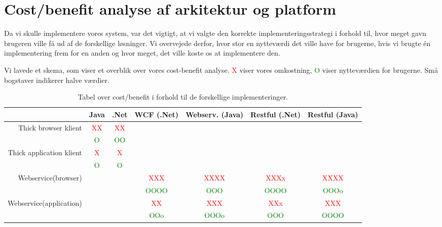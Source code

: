 \section{Cost/benefit analyse af arkitektur og platform}
\label{Technical_CostBen}
Da vi skulle implementere vores system, var det vigtigt, at vi valgte den korrekte implementeringsstrategi i forhold til, hvor meget gavn brugeren ville få ud af de forskellige løsninger. Vi overvejede derfor, hvor stor en nytteværdi det ville have for brugerne, hvis vi brugte én implementering frem for en anden og hvor meget, det ville koste os at implementere den. 

Vi lavede et skema, som viser et overblik over vores cost-benefit analyse. \textcolor{red}{X} viser vores omkostning, \textcolor{Green}{O} viser nytteværdien for brugerne. Små bogstaver indikerer halve værdier.

\begin{table}[h]
\begin{centering}
\begin{tabular}{| r | c | c | c | c | c | c |}
\hline
 & Java & .Net & WCF (.Net) & Webserv. (Java) & Restful (.Net) & Restful (Java)\\
\hline
Thick browser klient & \textcolor{red}{XX} & \textcolor{red}{XX} & & & & \\ \cline{2-3}
 & \textcolor{Green}{O} & \textcolor{Green}{OO} & & & & \\
\hline
Thick application klient & \textcolor{red}{X} & \textcolor{red}{X} & & & & \\ \cline{2-3}
 & \textcolor{Green}{O} & \textcolor{Green}{O} & & & & \\
\hline
Webservice(browser) & & & \textcolor{red}{XXX} & \textcolor{red}{XXXX} & \textcolor{red}{XXXx} & \textcolor{red}{XXXX} \\ \cline{4-7}
 & & & \textcolor{Green}{OOOO} & \textcolor{Green}{OOO} & \textcolor{Green}{OOOO} & \textcolor{Green}{OOOo}\\
\hline
Webservice(application) & & & \textcolor{red}{XX} & \textcolor{red}{XXX} & \textcolor{red}{XXx} & \textcolor{red}{XXX} \\ \cline{4-7}
 & & & \textcolor{Green}{OOo} & \textcolor{Green}{OOOo} & \textcolor{Green}{OOO} & \textcolor{Green}{OOOO}\\
\hline
\end{tabular}
\end{centering}
\caption{Tabel over cost/benefit i forhold til de forskellige implementeringer.}
\label{fig:Technical_CostBen_Table}
\end{table}


